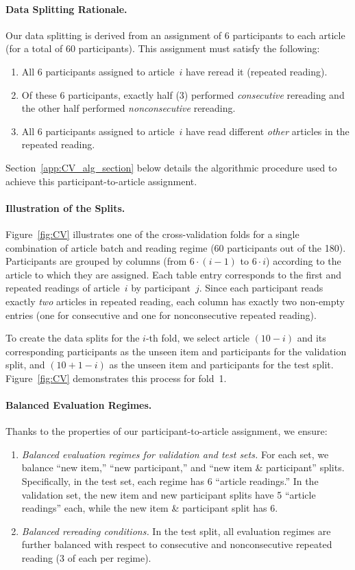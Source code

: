 \paragraph{Data Splitting Rationale.}
Our data splitting is derived from an assignment of 6 participants to each article (for a total of 60 participants). This assignment must satisfy the following:
\begin{enumerate}
    \item All 6 participants assigned to article~\(i\) have reread it (repeated reading).
    \item Of these 6 participants, exactly half (3) performed \emph{consecutive} rereading and the other half performed \emph{nonconsecutive} rereading.
    \item All 6 participants assigned to article~\(i\) have read different \emph{other} articles in the repeated reading. 
\end{enumerate}
Section~\ref{app:CV_alg_section} below details the algorithmic procedure used to achieve this participant-to-article assignment.

\paragraph{Illustration of the Splits.}
Figure~\ref{fig:CV} illustrates one of the cross-validation folds for a single combination of article batch and reading regime (60 participants out of the 180). Participants are grouped by columns (from \(6\cdot(i-1)\) to \(6 \cdot i\)) according to the article to which they are assigned. Each table entry corresponds to the first and repeated readings of article~\(i\) by participant~\(j\). Since each participant reads exactly \emph{two} articles in repeated reading, each column has exactly two non-empty entries (one for consecutive and one for nonconsecutive repeated reading).

To create the data splits for the \(i\)-th fold, we select article \((10-i)\) and its corresponding participants as the unseen item and participants for the validation split, and \((10+1-i)\) as the unseen item and participants for the test split. Figure~\ref{fig:CV} demonstrates this process for fold~1.

\paragraph{Balanced Evaluation Regimes.}
Thanks to the properties of our participant-to-article assignment, we ensure:
\begin{enumerate}
    \item \emph{Balanced evaluation regimes for validation and test sets.} For each set, we balance “new item,” “new participant,” and “new item \& participant” splits. Specifically, in the test set, each regime has 6 “article readings.” In the validation set, the new item and new participant splits have 5 “article readings” each, while the new item \& participant split has 6.
    \item \emph{Balanced rereading conditions.} In the test split, all evaluation regimes are further balanced with respect to consecutive and nonconsecutive repeated reading (3 of each per regime).
\end{enumerate}

